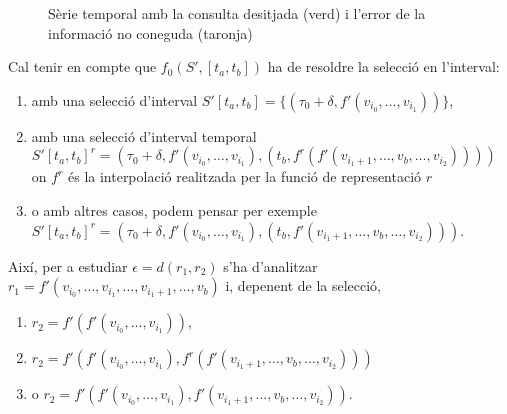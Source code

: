 \begin{itemize}
\begin{figure}[tp]

      \caption{Sèrie temporal amb la consulta desitjada (verd) i l'error de la
        informació no coneguda (taronja)}
  \label{fig:multiresolucio:informacio-subresolucions}
\end{figure}




  Cal tenir en compte que $f_0(S',[t_a,t_b])$ ha de resoldre la
  selecció en l'interval: 
  \begin{enumerate}
  \item amb una selecció d'interval $S'[t_a,t_b]=\{ (\tau_0+\delta,
    f'(v_{i_0},\dotsc,v_{i_1}) ) \}$,

  \item amb una selecció d'interval temporal
    $S'[t_a,t_b]^r=(\tau_0+\delta, f'(v_{i_0},\dotsc,v_{i_1}), (t_b,
    f^r(f'(v_{i_1+1},\dotsc,v_{b} ,\dotsc,v_{i_2}))) ) $ on $f^r$ és
    la interpolació realitzada per la funció de representació $r$

  \item o amb altres casos, podem pensar per exemple
    $S'[t_a,t_b]^r=(\tau_0+\delta, f'(v_{i_0},\dotsc,v_{i_1}), (t_b,
    f'(v_{i_1+1},\dotsc,v_{b} ,\dotsc,v_{i_2})) )$.
   \end{enumerate}



  Així, per a estudiar $\epsilon=d(r_1,r_2)$ s'ha d'analitzar
  $r_1=f'(v_{i_0},\dotsc,v_{i_1},\dotsc, v_{i_1+1},\dotsc,v_{b})$ i,
  depenent de la selecció,
   \begin{enumerate}
   \item $r_2=f'(f'(v_{i_0},\dotsc,v_{i_1}))$, 

   \item
     $r_2=f'(f'(v_{i_0},\dotsc,v_{i_1}),f^r(f'(v_{i_1+1},\dotsc,v_{b},\dotsc,v_{i_2})))$
     \item o $r_2=f'(f'(v_{i_0},\dotsc,v_{i_1}),f'(v_{i_1+1},\dotsc,v_{b},\dotsc,v_{i_2}))$.
\end{enumerate}


\end{itemize}
